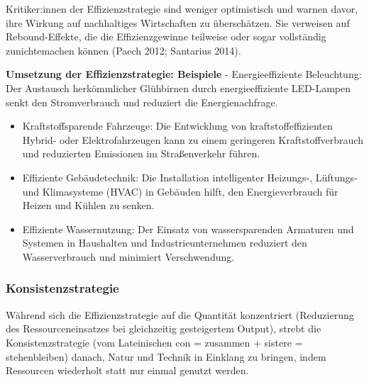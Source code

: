 \documentclass[
  letterpaper,
  DIV=11,
  numbers=noendperiod]{scrartcl}
\begin{document}
Kritiker:innen der Effizienzstrategie sind weniger optimistisch und
warnen davor, ihre Wirkung auf nachhaltiges Wirtschaften zu
überschätzen. Sie verweisen auf Rebound-Effekte, die die
Effizienzgewinne teilweise oder sogar vollständig zunichtemachen können
(Paech 2012; Santarius 2014).

\begin{tcolorbox}[enhanced jigsaw, opacitybacktitle=0.6, breakable, left=2mm, colback=white, leftrule=.75mm, colbacktitle=quarto-callout-tip-color!10!white, bottomrule=.15mm, toprule=.15mm, titlerule=0mm, title=\textcolor{quarto-callout-tip-color}{\faLightbulb}\hspace{0.5em}{Tip}, colframe=quarto-callout-tip-color-frame, bottomtitle=1mm, opacityback=0, arc=.35mm, toptitle=1mm, rightrule=.15mm, coltitle=black]

\textbf{Umsetzung der Effizienzstrategie: Beispiele} - Energieeffiziente
Beleuchtung: Der Austausch herkömmlicher Glühbirnen durch
energieeffiziente LED-Lampen senkt den Stromverbrauch und reduziert die
Energienachfrage.

\begin{itemize}
\item
  Kraftstoffsparende Fahrzeuge: Die Entwicklung von
  kraftstoffeffizienten Hybrid- oder Elektrofahrzeugen kann zu einem
  geringeren Kraftstoffverbrauch und reduzierten Emissionen im
  Straßenverkehr führen.
\item
  Effiziente Gebäudetechnik: Die Installation intelligenter Heizungs-,
  Lüftungs- und Klimasysteme (HVAC) in Gebäuden hilft, den
  Energieverbrauch für Heizen und Kühlen zu senken.
\item
  Effiziente Wassernutzung: Der Einsatz von wassersparenden Armaturen
  und Systemen in Haushalten und Industrieunternehmen reduziert den
  Wasserverbrauch und minimiert Verschwendung.
\end{itemize}

\end{tcolorbox}

\subsubsection{Konsistenzstrategie}\label{konsistenzstrategie}

Während sich die Effizienzstrategie auf die Quantität konzentriert
(Reduzierung des Ressourceneinsatzes bei gleichzeitig gesteigertem
Output), strebt die Konsistenzstrategie (vom Lateinischen con = zusammen
+ sistere = stehenbleiben) danach, Natur und Technik in Einklang zu
bringen, indem Ressourcen wiederholt statt nur einmal genutzt werden.
\end{document}
